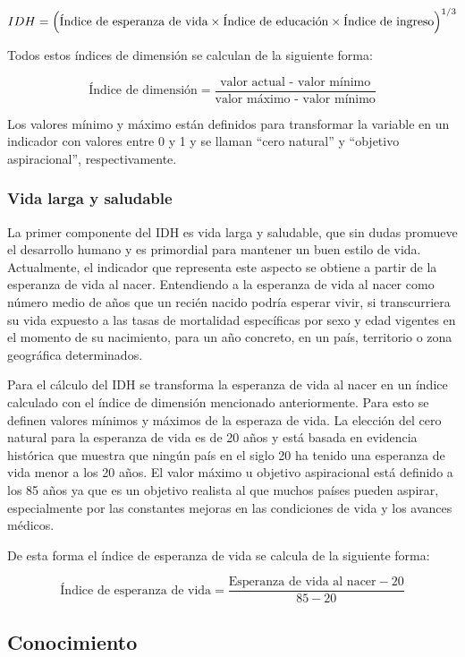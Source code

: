 \documentclass[
  10pt,
]{article}
\begin{document}
\[IDH = \Bigl(\text{Índice de esperanza de vida}\times\text{Índice de educación}\times\text{Índice de ingreso}\Bigl)^{1/3}\]

Todos estos índices de dimensión se calculan de la siguiente forma:

\[\text{Índice de dimensión}=\frac{\text{valor actual - valor mínimo}}{\text{valor máximo - valor mínimo}}\]

Los valores mínimo y máximo están definidos para transformar la variable
en un indicador con valores entre 0 y 1 y se llaman ``cero natural'' y
``objetivo aspiracional'', respectivamente.

\hypertarget{vida-larga-y-saludable}{%
\subsubsection{Vida larga y saludable}\label{vida-larga-y-saludable}}

La primer componente del IDH es vida larga y saludable, que sin dudas
promueve el desarrollo humano y es primordial para mantener un buen
estilo de vida. Actualmente, el indicador que representa este aspecto se
obtiene a partir de la esperanza de vida al nacer. Entendiendo a la
esperanza de vida al nacer como número medio de años que un recién
nacido podría esperar vivir, si transcurriera su vida expuesto a las
tasas de mortalidad específicas por sexo y edad vigentes en el momento
de su nacimiento, para un año concreto, en un país, territorio o zona
geográfica determinados.

Para el cálculo del IDH se transforma la esperanza de vida al nacer en
un índice calculado con el índice de dimensión mencionado anteriormente.
Para esto se definen valores mínimos y máximos de la esperaza de vida.
La elección del cero natural para la esperanza de vida es de 20 años y
está basada en evidencia histórica que muestra que ningún país en el
siglo 20 ha tenido una esperanza de vida menor a los 20 años. El valor
máximo u objetivo aspiracional está definido a los 85 años ya que es un
objetivo realista al que muchos países pueden aspirar, especialmente por
las constantes mejoras en las condiciones de vida y los avances médicos.

De esta forma el índice de esperanza de vida se calcula de la siguiente
forma:

\[\text{Índice de esperanza de vida} = \frac{\text{Esperanza de vida al nacer}-20}{85-20}\]

\hypertarget{conocimiento}{%
\subsection{Conocimiento}\label{conocimiento}}
\end{document}
